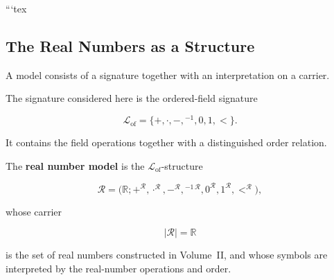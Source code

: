 ```tex
%
%
%

\subsection{The Real Numbers as a Structure}
\label{subsec:real-numbers-as-a-structure}



\begin{remark*}[Exposition]

A model consists of a signature together with an interpretation on a carrier.

The signature considered here is the ordered-field signature

\[
\mathcal L_{\mathrm{of}}
=
\{+,\cdot,-,{}^{-1},0,1,<\}.
\]

It contains the field operations together with a distinguished order relation.

\end{remark*}


\begin{definition}
\label{def:real-number-model}

The \textbf{real number model} is the
$\mathcal L_{\mathrm{of}}$-structure

\[
\mathcal R
=
\bigl(
\mathbb R;
+^{\mathcal R},
\cdot^{\mathcal R},
-^{\mathcal R},
{}^{-1\,\mathcal R},
0^{\mathcal R},
1^{\mathcal R},
<^{\mathcal R}
\bigr),
\]

whose carrier

\[
|\mathcal R|
=
\mathbb R
\]

is the set of real numbers constructed in Volume~II, and whose symbols are
interpreted by the real-number operations and order.

\end{definition}

